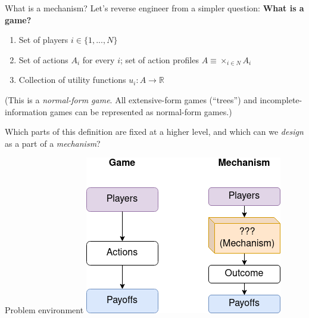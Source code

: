 \documentclass[english,10pt
,aspectratio=169
]{beamer}
\begin{document}

\begin{frame}{What is a mechanism?}
	Let's reverse engineer from a simpler question:
	\textbf{What is a game?}
	\begin{enumerate}
		\item Set of players $i \in\{ 1,...,N\}$
		\item Set of actions $A_i$ for every $i$; set of action profiles $A \equiv \times_{i \in N} A_i$
		\item Collection of utility functions $u_i: A \to \mathbb{R}$
	\end{enumerate}
	(This is a \emph{normal-form game}. All extensive-form games (``trees'') and incomplete-information games can be represented as normal-form games.)
	
	Which parts of this definition are fixed at a higher level, and which can we \emph{design} as a part of a \emph{mechanism}?
\end{frame}


\begin{frame}{Problem environment}
	\centering
	\includegraphics[scale=0.7]{pics/L2/game_vs_mech}
\end{frame}
\end{document}
